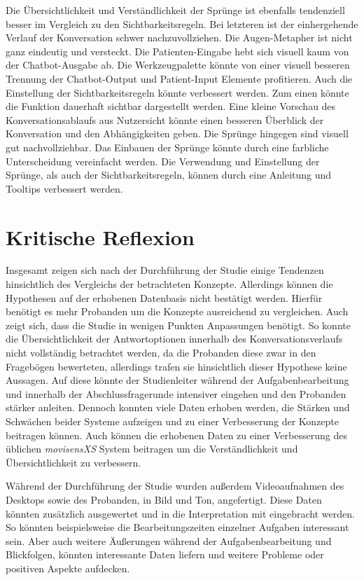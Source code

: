Die Übersichtlichkeit und Verständlichkeit der Sprünge ist ebenfalls tendenziell besser im Vergleich zu den Sichtbarkeitsregeln. Bei letzteren ist der einhergehende Verlauf der Konversation schwer nachzuvollziehen. Die Augen-Metapher ist nicht ganz eindeutig und versteckt. Die Patienten-Eingabe hebt sich visuell kaum von der Chatbot-Ausgabe ab. Die Werkzeugpalette könnte von einer visuell besseren Trennung der Chatbot-Output und Patient-Input Elemente profitieren. Auch die Einstellung der Sichtbarkeitsregeln könnte verbessert werden. Zum einen könnte die Funktion dauerhaft sichtbar dargestellt werden. Eine kleine Vorschau des Konversationsablaufs aus Nutzersicht könnte einen besseren Überblick der Konversation und den Abhängigkeiten geben. Die Sprünge hingegen sind visuell gut nachvollziehbar. Das Einbauen der Sprünge könnte durch eine farbliche Unterscheidung vereinfacht werden. Die Verwendung und Einstellung der Sprünge, als auch der Sichtbarkeitsregeln, können durch eine Anleitung und Tooltips verbessert werden.


\section{Kritische Reflexion}
Insgesamt zeigen sich nach der Durchführung der Studie einige Tendenzen hinsichtlich des Vergleichs der betrachteten Konzepte. Allerdings können die Hypothesen auf der erhobenen Datenbasis nicht bestätigt werden. Hierfür benötigt es mehr Probanden um die Konzepte ausreichend zu vergleichen. Auch zeigt sich, dass die Studie in wenigen Punkten Anpassungen benötigt. So konnte die Übersichtlichkeit der Antwortoptionen innerhalb des Konversationsverlaufs nicht vollständig betrachtet werden, da die Probanden diese zwar in den Fragebögen bewerteten, allerdings trafen sie hinsichtlich dieser Hypothese keine Aussagen. Auf diese könnte der Studienleiter während der Aufgabenbearbeitung und innerhalb der Abschlussfragerunde intensiver eingehen und den Probanden stärker anleiten. Dennoch konnten viele Daten erhoben werden, die Stärken und Schwächen beider Systeme aufzeigen und zu einer Verbesserung der Konzepte beitragen können. Auch können die erhobenen Daten zu einer Verbesserung des üblichen \emph{movisensXS} System beitragen um die Verständlichkeit und Übersichtlichkeit zu verbessern. 

Während der Durchführung der Studie wurden außerdem Videoaufnahmen des Desktops sowie des Probanden, in Bild und Ton, angefertigt. Diese Daten könnten zusätzlich ausgewertet und in die Interpretation mit eingebracht werden. So könnten beispielsweise die Bearbeitungszeiten einzelner Aufgaben interessant sein. Aber auch weitere Äußerungen während der Aufgabenbearbeitung und Blickfolgen, könnten interessante Daten liefern und weitere Probleme oder positiven Aspekte aufdecken.



